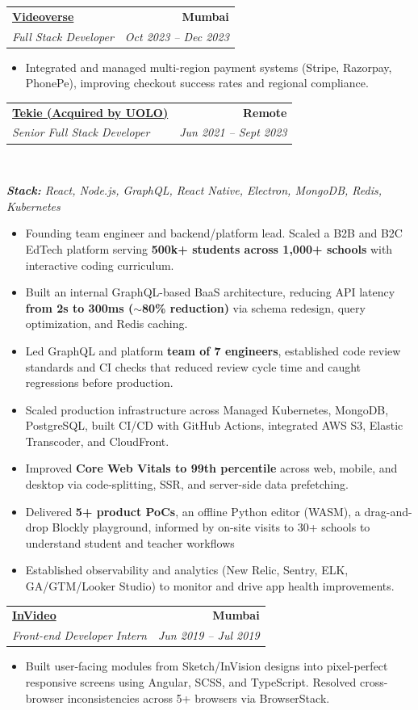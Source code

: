 \documentclass[letterpaper,11pt]{article}
\makeatletter
\newcommand{\resumeItem}[1]{
  \item\small{
    {#1 \vspace{.8pt}}
  }
}
\newcommand{\resumeSubheading}[4]{
  \vspace{-2pt}\item
    \begin{tabular*}{1.0\textwidth}[t]{l@{\extracolsep{\fill}}r}
      \textbf{\large#1} & \textbf{\small #2} \\
      \textit{\small#3} & \textit{\small #4} \\
    \end{tabular*}\vspace{-7pt}
}
\newcommand{\resumeItemListStart}{\begin{itemize}}
\newcommand{\resumeItemListEnd}{\end{itemize}\vspace{-5pt}}
\makeatother
\begin{document}
    \resumeSubheading
      {\href{https://illusto.com/}{Videoverse}}{Mumbai} 
      {\large{Full Stack Developer}}{Oct 2023 -- Dec 2023}
      \resumeItemListStart
        \resumeItem{\normalsize{Integrated and managed multi-region payment systems (Stripe, Razorpay, PhonePe), improving checkout success rates and regional compliance.}}
      \resumeItemListEnd

    \resumeSubheading
          {\href{https://www.theuolo.com/tekie.html} {\large{Tekie (Acquired by UOLO})}}{Remote}
          {\large{Senior Full Stack Developer}}{Jun 2021 -- Sept 2023} \\
          \vspace{2pt}
          \item[]{\small{\textit{\textbf{Stack:} React, Node.js, GraphQL, React Native, Electron, MongoDB, Redis, Kubernetes}}}
          \vspace{-3pt}
          \resumeItemListStart
              \resumeItem{\normalsize{Founding team engineer and backend/platform lead. Scaled a B2B and B2C EdTech platform serving \textbf{500k+ students across 1,000+ schools} with interactive coding curriculum.}}
              \resumeItem{\normalsize{Built an internal GraphQL-based BaaS architecture, reducing API latency \textbf{from 2s to 300ms ($\sim$80\% reduction)} via schema redesign, query optimization, and Redis caching.}}
              \resumeItem{\normalsize{Led GraphQL and platform \textbf{team of 7 engineers}, established code review standards and CI checks that reduced review cycle time and caught regressions before production.}}
              \resumeItem{\normalsize{Scaled production infrastructure across Managed Kubernetes, MongoDB, PostgreSQL, built CI/CD with GitHub Actions, integrated AWS S3, Elastic Transcoder, and CloudFront.}}
              \resumeItem{\normalsize{Improved \textbf{Core Web Vitals to 99th percentile} across web, mobile, and desktop via code-splitting, SSR, and server-side data prefetching.}}
              \resumeItem{\normalsize{Delivered \textbf{5+ product PoCs}, an offline Python editor (WASM), a drag-and-drop Blockly playground, informed by on-site visits to 30+ schools to understand student and teacher workflows}}
              \resumeItem{\normalsize{Established observability and analytics (New Relic, Sentry, ELK, GA/GTM/Looker Studio) to monitor and drive app health improvements.}}
      \resumeItemListEnd

    \resumeSubheading
      {\href{https://invideo.io/}{InVideo}}{Mumbai} 
      {\large{Front-end Developer Intern}}{Jun 2019 -- Jul 2019}
      \resumeItemListStart
        \resumeItem{\normalsize{Built user-facing modules from Sketch/InVision designs into pixel-perfect responsive screens using Angular, SCSS, and TypeScript. Resolved cross-browser inconsistencies across 5+ browsers via BrowserStack.}}
      \resumeItemListEnd  
\end{document}
